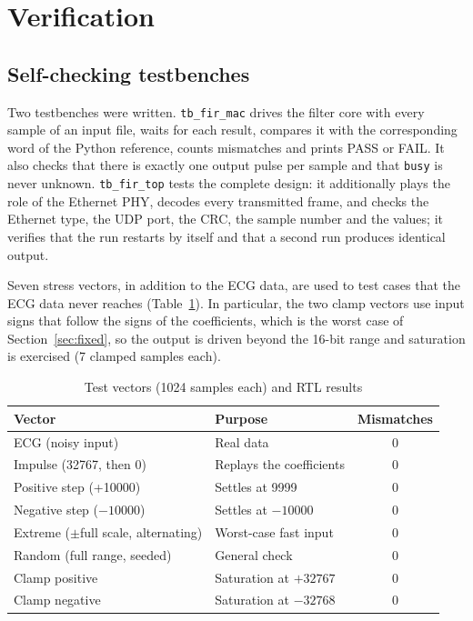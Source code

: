 \documentclass{ieeeaccess}
\begin{document}
\section{Verification}
\label{sec:verification}
\subsection{Self-checking testbenches}
Two testbenches were written. \texttt{tb\_fir\_mac} drives the filter core with every sample of an input file, waits for each result, compares it with the corresponding word of the Python reference, counts mismatches and prints PASS or FAIL. It also checks that there is exactly one output pulse per sample and that \texttt{busy} is never unknown. \texttt{tb\_fir\_top} tests the complete design: it additionally plays the role of the Ethernet PHY, decodes every transmitted frame, and checks the Ethernet type, the UDP port, the CRC, the sample number and the values; it verifies that the run restarts by itself and that a second run produces identical output.

Seven stress vectors, in addition to the ECG data, are used to test cases that the ECG data never reaches (Table~\ref{tab:vectors}). In particular, the two clamp vectors use input signs that follow the signs of the coefficients, which is the worst case of Section~\ref{sec:fixed}, so the output is driven beyond the 16-bit range and saturation is exercised (7 clamped samples each).

\begin{table}[!t]
\caption{Test vectors (1024 samples each) and RTL results}
\label{tab:vectors}
\centering
\footnotesize
\begin{tabular}{llc}
\toprule
Vector & Purpose & Mismatches \\
\midrule
ECG (noisy input) & Real data & 0 \\
Impulse (32767, then 0) & Replays the coefficients & 0 \\
Positive step (+10000) & Settles at 9999 & 0 \\
Negative step ($-10000$) & Settles at $-10000$ & 0 \\
Extreme ($\pm$full scale, alternating) & Worst-case fast input & 0 \\
Random (full range, seeded) & General check & 0 \\
Clamp positive & Saturation at $+32767$ & 0 \\
Clamp negative & Saturation at $-32768$ & 0 \\
\bottomrule
\end{tabular}
\end{table}
\end{document}
